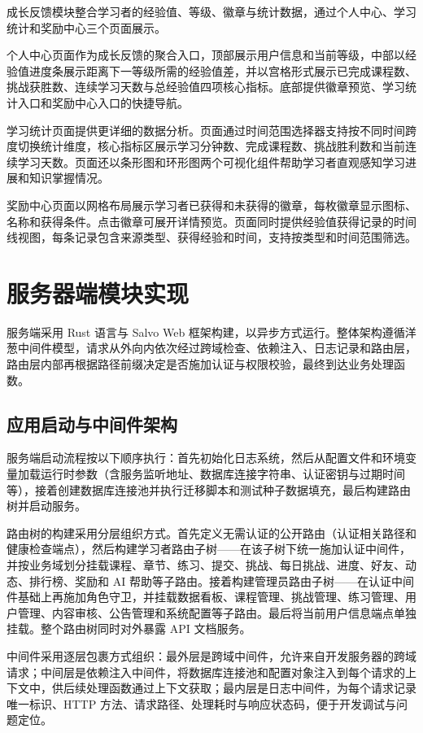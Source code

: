 成长反馈模块整合学习者的经验值、等级、徽章与统计数据，通过个人中心、学习统计和奖励中心三个页面展示。

个人中心页面作为成长反馈的聚合入口，顶部展示用户信息和当前等级，中部以经验值进度条展示距离下一等级所需的经验值差，并以宫格形式展示已完成课程数、挑战获胜数、连续学习天数与总经验值四项核心指标。底部提供徽章预览、学习统计入口和奖励中心入口的快捷导航。

学习统计页面提供更详细的数据分析。页面通过时间范围选择器支持按不同时间跨度切换统计维度，核心指标区展示学习分钟数、完成课程数、挑战胜利数和当前连续学习天数。页面还以条形图和环形图两个可视化组件帮助学习者直观感知学习进展和知识掌握情况。

奖励中心页面以网格布局展示学习者已获得和未获得的徽章，每枚徽章显示图标、名称和获得条件。点击徽章可展开详情预览。页面同时提供经验值获得记录的时间线视图，每条记录包含来源类型、获得经验和时间，支持按类型和时间范围筛选。

\section{服务器端模块实现}

服务端采用 Rust 语言与 Salvo Web 框架构建，以异步方式运行。整体架构遵循洋葱中间件模型，请求从外向内依次经过跨域检查、依赖注入、日志记录和路由层，路由层内部再根据路径前缀决定是否施加认证与权限校验，最终到达业务处理函数。

\subsection{应用启动与中间件架构}

服务端启动流程按以下顺序执行：首先初始化日志系统，然后从配置文件和环境变量加载运行时参数（含服务监听地址、数据库连接字符串、认证密钥与过期时间等），接着创建数据库连接池并执行迁移脚本和测试种子数据填充，最后构建路由树并启动服务。

路由树的构建采用分层组织方式。首先定义无需认证的公开路由（认证相关路径和健康检查端点），然后构建学习者路由子树——在该子树下统一施加认证中间件，并按业务域划分挂载课程、章节、练习、提交、挑战、每日挑战、进度、好友、动态、排行榜、奖励和 AI 帮助等子路由。接着构建管理员路由子树——在认证中间件基础上再施加角色守卫，并挂载数据看板、课程管理、挑战管理、练习管理、用户管理、内容审核、公告管理和系统配置等子路由。最后将当前用户信息端点单独挂载。整个路由树同时对外暴露 API 文档服务。

中间件采用逐层包裹方式组织：最外层是跨域中间件，允许来自开发服务器的跨域请求；中间层是依赖注入中间件，将数据库连接池和配置对象注入到每个请求的上下文中，供后续处理函数通过上下文获取；最内层是日志中间件，为每个请求记录唯一标识、HTTP 方法、请求路径、处理耗时与响应状态码，便于开发调试与问题定位。

